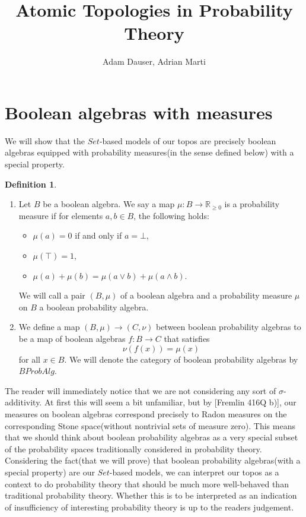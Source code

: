 \documentclass[a4paper,draft]{amsproc}
\title{\textbf{Atomic Topologies in Probability Theory}}
\author{Adam Dauser, Adrian Marti} %
\date{}
\theoremstyle{plain}
\theoremstyle{definition}
\newtheorem{definition}{Definition}[section]
\theoremstyle{remark}
\numberwithin{equation}{section}
\begin{document}
\maketitle 

\section{Boolean algebras with measures}

We will show that the $Set$-based models of our topos are precisely boolean algebras equipped with probability measures(in the sense defined below) with a special property.

\begin{definition}
\begin{enumerate}
\item Let $B$ be a boolean algebra. We say a map $\mu: B \to \mathbb{R}_{\geq 0}$ is a probability measure if for elements $a,b \in B$, the following holds:
\begin{itemize}
\item $\mu(a) = 0$ if and only if $a = \bot $,
\item $\mu(\top) = 1$,
\item $\mu(a) + \mu(b) = \mu(a \vee b) + \mu(a \wedge b)$.
\end{itemize}
We will call a pair $(B, \mu)$ of a boolean algebra and a probability measure $\mu$ on $B$ a boolean probability algebra.
\item We define a map $(B, \mu) \to (C, \nu)$ between boolean probability algebras to be a map of boolean algebras $f: B \to C$ that satisfies
\[
\nu(f(x)) = \mu(x)
\]
for all $x \in B$. We will denote the category of boolean probability algebras by $BProbAlg$.
\end{enumerate}
\end{definition}

The reader will immediately notice that we are not considering any sort of $\sigma$-additivity. At first this will seem a bit unfamiliar, but by [Fremlin 416Q b)], our measures on boolean algebras correspond precisely to Radon measures on the corresponding Stone space(without nontrivial sets of measure zero). This means that we should think about boolean probability algebras as a very special subset of the probability spaces traditionally considered in probability theory. Considering the fact(that we will prove) that boolean probability algebras(with a special property) are our $Set$-based models, we can interpret our topos as a context to do probability theory that should be much more well-behaved than traditional probability theory. Whether this is to be interpreted as an indication of insufficiency of interesting probability theory is up to the readers judgement.
\end{document}
